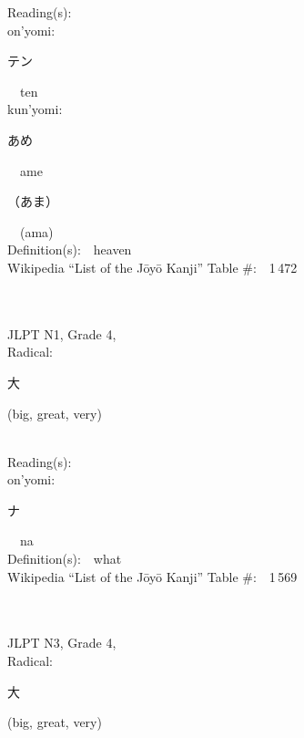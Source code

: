 \begin{multicols}{2}
Reading(s):\ \ \\
{\hspace*{1em}}on'yomi:\ \ \\
{\hspace*{2em}}{\begin{CJK}{UTF8}{min} テン \end{CJK}}\ \ ten\ \ \\
{\hspace*{1em}}kun'yomi:\ \ \\
{\hspace*{2em}}{\begin{CJK}{UTF8}{min} あめ \end{CJK}}\ \ ame\ \ \\
{\hspace*{2em}}{\begin{CJK}{UTF8}{min} （あま） \end{CJK}}\ \ (ama)\ \ \\
Definition(s):\ \ heaven \\
Wikipedia ``List of the J\=oy\=o Kanji'' Table \#:\ \ 1\,472 \\
\ \ \\
{\fontsize{34pt}{40pt}  }\ \ \\  %
{JLPT N1, Grade 4, \\Radical:\ \ {\begin{CJK}{UTF8}{min} 大 \end{CJK}} (big, great, very) } \\
Reading(s):\ \ \\
{\hspace*{1em}}on'yomi:\ \ \\
{\hspace*{2em}}{\begin{CJK}{UTF8}{min} ナ \end{CJK}}\ \ na\ \ \\
Definition(s):\ \ what \\
Wikipedia ``List of the J\=oy\=o Kanji'' Table \#:\ \ 1\,569 \\
\ \ \\
{\fontsize{34pt}{40pt}  }\ \ \\  %
{JLPT N3, Grade 4, \\Radical:\ \ {\begin{CJK}{UTF8}{min} 大 \end{CJK}} (big, great, very) } \\

\end{multicols}
